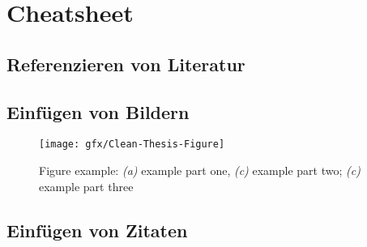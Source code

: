 \chapter{Cheatsheet}

\section{Referenzieren von Literatur}
\cite{Jurgens:2000,Jurgens:1995}
\cite{WEB:GNU:GPL:2010,WEB:Miede:2011}

\section{Einfügen von Bildern}
\begin{figure}[htb]
	\texttt{[image: gfx/Clean-Thesis-Figure]}
	\caption{Figure example: \textit{(a)} example part one, \textit{(c)} example part two; \textit{(c)} example part three}
	\label{fig:system:example1}
\end{figure}

\section{Einfügen von Zitaten}
